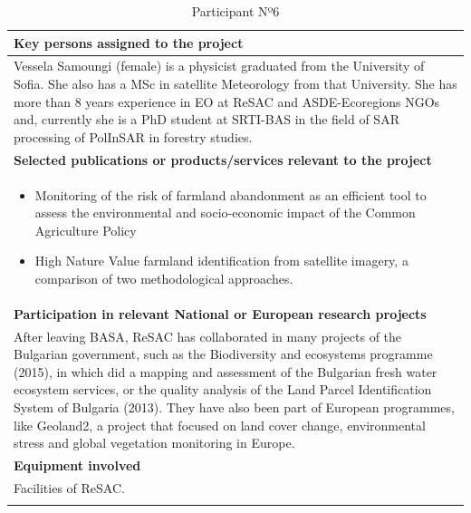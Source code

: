 \begin{longtable}[H]{|p{0.7cm}|p{4cm}|p{7cm}|p{1.3cm}|}
	\multicolumn{4}{|p{13cm}|}{\textbf{Key persons assigned to the project}}   \\ \hline
	
	\multicolumn{4}{|p{14.5cm}|}{Vessela Samoungi (female) is a physicist graduated from the University of Sofia. She also has a MSc in satellite Meteorology from that University. She has more than 8 years experience in EO at ReSAC and ASDE-Ecoregions NGOs and, currently she is a PhD student at SRTI-BAS in the field of SAR processing of PolInSAR in forestry studies.}  \\ \hline
	
	\multicolumn{4}{|p{13cm}|}{\textbf{Selected publications or products/services relevant to the project}}  \\ \hline
	
	\multicolumn{4}{|p{14.5cm}|}{
		\begin{itemize}
			\item  \vspace{-0.5cm}Monitoring of the risk of farmland abandonment as an efficient tool to assess the environmental and socio-economic impact of the Common Agriculture Policy
			\item High Nature Value farmland identification from satellite imagery, a comparison of two methodological approaches.\vspace{-0.3cm}
		\end{itemize}	
      }  \\ \hline
	
	\multicolumn{4}{|p{13cm}|}{\textbf{Participation in relevant National or European research projects}}  \\ \hline
	
	\multicolumn{4}{|p{14.5cm}|}{After leaving BASA, ReSAC has collaborated in many projects of the Bulgarian government, such as the Biodiversity and ecosystems programme (2015), in which did a mapping and assessment of the Bulgarian fresh water ecosystem services, or the quality analysis of the Land Parcel Identification System of Bulgaria (2013). They have also been part of European programmes, like Geoland2, a project that focused on land cover change, environmental stress and global vegetation monitoring in Europe.}  \\ \hline
	
	\multicolumn{4}{|p{13cm}|}{\textbf{Equipment involved}}  \\ \hline
	
	\multicolumn{4}{|p{14.5cm}|}{Facilities of ReSAC.}  \\ \hline
	\caption{Participant Nº6}
\end{longtable}


